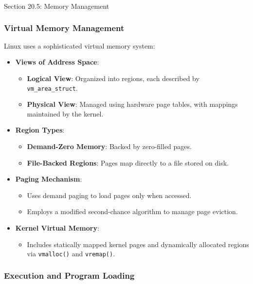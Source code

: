 \begin{notes}{Section 20.5: Memory Management}
    \subsubsection*{Virtual Memory Management}
    
    Linux uses a sophisticated virtual memory system:
    \begin{itemize}
        \item \textbf{Views of Address Space}:
        \begin{itemize}
            \item \textbf{Logical View}: Organized into regions, each described by \texttt{vm\_area\_struct}.
            \item \textbf{Physical View}: Managed using hardware page tables, with mappings maintained by the kernel.
        \end{itemize}
        \item \textbf{Region Types}:
        \begin{itemize}
            \item \textbf{Demand-Zero Memory}: Backed by zero-filled pages.
            \item \textbf{File-Backed Regions}: Pages map directly to a file stored on disk.
        \end{itemize}
        \item \textbf{Paging Mechanism}:
        \begin{itemize}
            \item Uses demand paging to load pages only when accessed.
            \item Employs a modified second-chance algorithm to manage page eviction.
        \end{itemize}
        \item \textbf{Kernel Virtual Memory}:
        \begin{itemize}
            \item Includes statically mapped kernel pages and dynamically allocated regions via \texttt{vmalloc()} and \texttt{vremap()}.
        \end{itemize}
    \end{itemize}
    
    \subsubsection*{Execution and Program Loading}
    

\end{notes}
